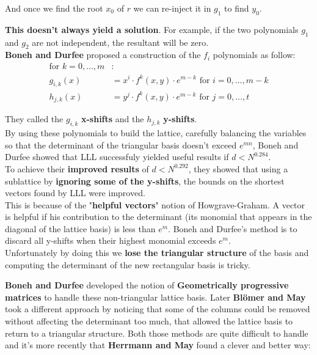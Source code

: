 \documentclass[a4paper,11pt]{article}
\begin{document}
And once we find the root $x_0$ of $r$ we can re-inject it in $g_1$ to find $y_0$.

\textbf{This doesn't always yield a solution}. For example, if the two polynomials $g_1$ and $g_2$ are not independent, the resultant will be zero.\\

\textbf{Boneh and Durfee} proposed a construction of the $f_i$ polynomials as follow:
\begin{align*}
	\text{for } k = 0,\hdots,m&:\\
	g_{i,k}(x) &= x^i \cdot f^k(x,y) \cdot e^{m-k} \text{ for } i=0,\hdots,m-k\\
	h_{j,k}(x) &= y^j \cdot f^k(x,y) \cdot e^{m-k} \text{ for } j = 0,\hdots,t
\end{align*}

They called the $g_{i,k}$ \textbf{x-shifts} and the $h_{j,k}$ \textbf{y-shifts}.\\

By using these polynomials to build the lattice, carefully balancing the variables so that the determinant of the triangular basis doesn't exceed $e^{mn}$, Boneh and Durfee showed that LLL successfuly yielded useful results if $d < N^{0.284}$.\\

To achieve their \textbf{improved results} of $d < N^{0.292}$, they showed that using a sublattice by \textbf{ignoring some of the y-shifts}, the bounds on the shortest vectors found by LLL were improved.\\
This is because of the "\textbf{helpful vectors}" notion of Howgrave-Graham. A vector is helpful if his contribution to the determinant (its monomial that appears in the diagonal of the lattice basis) is less than $e^m$. Boneh and Durfee's method is to discard all y-shifts when their highest monomial exceeds $e^m$.\\
Unfortunately by doing this we \textbf{lose the triangular structure} of the basis and computing the determinant of the new rectangular basis is tricky.

\textbf{Boneh and Durfee} developed the notion of \textbf{Geometrically progressive matrices} to handle these non-triangular lattice basis. Later \textbf{Blömer and May} took a different approach by noticing that some of the columns could be removed without affecting the determinant too much, that allowed the lattice basis to return to a triangular structure. Both those methods are quite difficult to handle and it's more recently that \textbf{Herrmann and May} found a clever and better way:\\
\end{document}
